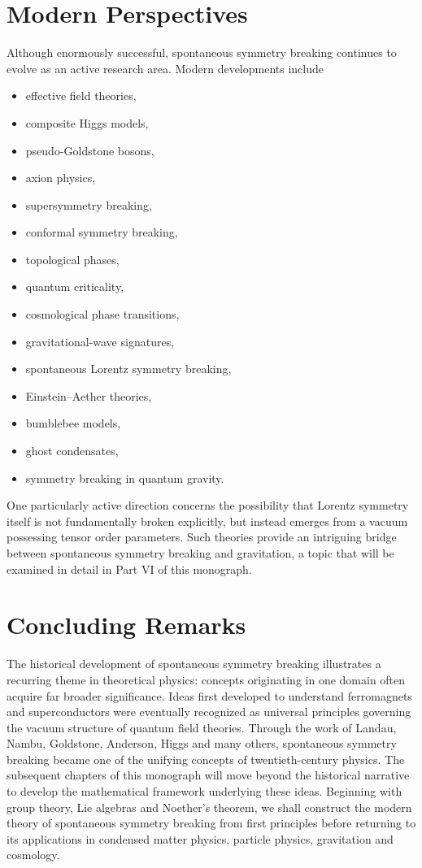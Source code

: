 \section{Modern Perspectives}
Although enormously successful, spontaneous symmetry breaking continues
to evolve as an active research area.
Modern developments include
\begin{itemize}
\item effective field theories,
\item composite Higgs models,
\item pseudo-Goldstone bosons,
\item axion physics,
\item supersymmetry breaking,
\item conformal symmetry breaking,
\item topological phases,
\item quantum criticality,
\item cosmological phase transitions,
\item gravitational-wave signatures,
\item spontaneous Lorentz symmetry breaking,
\item Einstein--Aether theories,
\item bumblebee models,
\item ghost condensates,
\item symmetry breaking in quantum gravity.
\end{itemize}
One particularly active direction concerns the possibility that Lorentz
symmetry itself is not fundamentally broken explicitly, but instead
emerges from a vacuum possessing tensor order parameters. Such theories
provide an intriguing bridge between spontaneous symmetry breaking and
gravitation, a topic that will be examined in detail in Part VI of this
monograph.

\section{Concluding Remarks}
The historical development of spontaneous symmetry breaking illustrates
a recurring theme in theoretical physics: concepts originating in one
domain often acquire far broader significance.
Ideas first developed to understand ferromagnets and superconductors
were eventually recognized as universal principles governing the vacuum
structure of quantum field theories. Through the work of Landau, Nambu,
Goldstone, Anderson, Higgs and many others, spontaneous symmetry
breaking became one of the unifying concepts of twentieth-century
physics.
The subsequent chapters of this monograph will move beyond the
historical narrative to develop the mathematical framework underlying
these ideas. Beginning with group theory, Lie algebras and Noether's
theorem, we shall construct the modern theory of spontaneous symmetry
breaking from first principles before returning to its applications in
condensed matter physics, particle physics, gravitation and cosmology.

